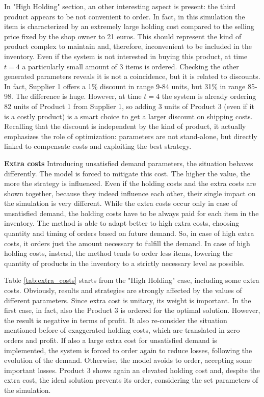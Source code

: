 \documentclass{article}
\begin{document}
In "High Holding" section, an other interesting aspect is present: the third product appears to be not convenient to order. In fact, in this simulation the item is characterized by an extremely large holding cost compared to the selling price fixed by the shop owner to 21 euros. This should represent the kind of product complex to maintain and, therefore, inconvenient to be included in the inventory. Even if the system is not interested in buying this product, at time $t=4$ a particularly small amount of 3 items is ordered. Checking the other generated parameters reveals it is not a coincidence, but it is related to discounts. In fact, Supplier 1 offers a 1\% discount in range 9-84 units, but 31\% in range 85-98. The difference is huge. However, at time $t=4$ the system is already ordering 82 units of Product 1 from Supplier 1, so adding 3 units of Product 3 (even if it is a costly product) is a smart choice to get a larger discount on shipping costs. Recalling that the discount is independent by the kind of product, it actually emphasizes the role of optimization: parameters are not stand-alone, but directly linked to compensate costs and exploiting the best strategy.\newline

\noindent
\textbf{Extra costs}\newline
Introducing unsatisfied demand parameters, the situation behaves differently. The model is forced to mitigate this cost. The higher the value, the more the strategy is influenced. 
\noindent
Even if the holding costs and the extra costs are shown together, because they indeed influence each other, their single impact on the simulation is very different.
While the extra costs occur only in case of unsatisfied demand, the holding costs have to be always paid for each item in the inventory. The method is able to adapt better to high extra costs, choosing quantity and timing of orders based on future demand. So, in case of high extra costs, it orders just the amount necessary to fulfill the demand. In case of high holding costs, instead, the method tends to order less items, lowering the quantity of products in the inventory to a strictly necessary level as possible. \par
Table \ref{tab:extra_costs} starts from the "High Holding" case, including some extra costs. Obviously, results and strategies are strongly affected by the values of different parameters. Since extra cost is unitary, its weight is important. In the first case, in fact, also the Product 3 is ordered for the optimal solution. However, the result is negative in terms of profit.
It also re-consider the situation mentioned before of exaggerated holding costs, which are translated in zero orders and profit. If also a large extra cost for unsatisfied demand is implemented, the system is forced to order again to reduce losses, following the evolution of the demand. Otherwise, the model avoids to order, accepting some important losses. Product 3 shows again an elevated holding cost and, despite the extra cost, the ideal solution prevents its order, considering the set parameters of the simulation.
\end{document}
